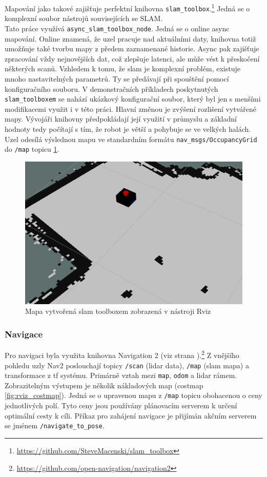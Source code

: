 Mapování jako takové zajišťuje perfektní knihovna \verb|slam_toolbox|.\footnote{\url{https://github.com/SteveMacenski/slam_toolbox}} Jedná se o komplexní soubor nástrojů souvisejících se SLAM. \\ Tato práce využívá \verb|async_slam_toolbox_node|. Jedná se o online async mapování. Online znamená, že uzel pracuje nad aktuálními daty, knihovna totiž umožňuje také tvorbu mapy z předem zaznamenané historie. Async pak zajišťuje zpracování vždy nejnovějších dat, což zlepšuje latenci, ale může vést k přeskočení některých scanů. Vzhledem k tomu, že slam je komplexní problém, existuje mnoho nastavitelných parametrů. Ty se předávají při spouštění pomocí konfiguračního souboru. V demonstračních příkladech poskytnutých \verb|slam_toolboxem| se nahází ukázkový konfigurační soubor, který byl jen s menšími modifikacemi využit i v této práci. Hlavní změnou je zvýšení rozlišení vytvářené mapy. Vývojáři knihovny předpokládají její využití v průmyslu a základní hodnoty tedy počítají s tím, že robot je větší a pohybuje se ve velkých halách. Uzel odesílá výslednou mapu ve standardním formátu \verb|nav_msgs/OccupancyGrid| do \verb|/map| topicu \ref{fig:rviz_slam_map}.

\begin{figure}[h!]
	\centering
	\includegraphics[scale=0.7]{obrazky-figures/slam.png}
	\caption{Mapa vytvořená slam toolboxem zobrazená v nástroji Rviz}
	\label{fig:rviz_slam_map}
\end{figure}

\subsubsection*{Navigace}
Pro navigaci byla využita knihovna Navigation 2 (viz strana \pageref{theory:nav2}).\footnote{\url{https://github.com/open-navigation/navigation2}} 
Z vnějšího pohledu uzly Nav2 poslouchají topicy \verb|/scan| (lidar data), \verb|/map| (slam mapa) a transformace z tf systému. Primárně vztah mezi \verb|map|, \verb|odom| a lidar rámem. Zobrazitelným výstupem je několik nákladových map (costmap \ref{fig:rviz_costmap}). Jedná se o upravenou mapu z \verb|/map| topicu obohacenou o ceny jednotlivých polí. Tyto ceny jsou používány plánovacím serverem k určení optimální cesty k cíli. Příkaz pro zahájení navigace je přijímán akčním serverem se jménem \verb|/navigate_to_pose|. 

